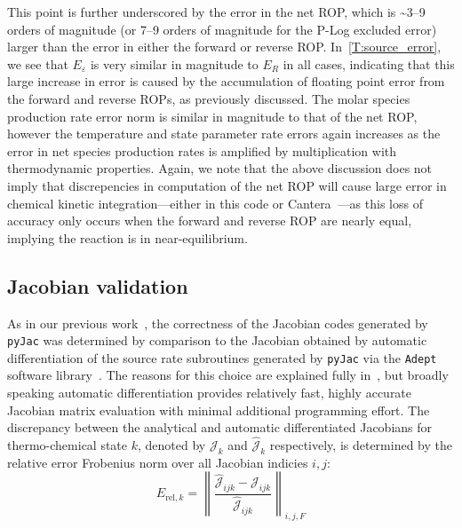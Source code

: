\documentclass[12pt,number,sort&compress,preprint]{elsarticle}
\begin{document}
This point is further underscored by the error in the net ROP, which is \textasciitilde\numrange{3}{9} orders of magnitude (or \numrange{7}{9} orders of magnitude for the P-Log excluded error) larger than the error in either the forward or reverse ROP.
In~\cref{T:source_error}, we see that $E_{\varepsilon}$ is very similar in magnitude to $E_R$ in all cases, indicating that this large increase in error is caused by the accumulation of floating point error from the forward and reverse ROPs, as previously discussed.
The molar species production rate error norm is similar in magnitude to that of the net ROP, however the temperature and state parameter rate errors again increases as the error in net species production rates is amplified by multiplication with thermodynamic properties.
Again, we note that the above discussion does not imply that discrepencies in computation of the net ROP will cause large error in chemical kinetic integration---either in this code or Cantera~\cite{Cantera}---as this loss of accuracy only occurs when the forward and reverse ROP are nearly equal, implying the reaction is in near-equilibrium.

\subsection{Jacobian validation}

As in our previous work~\cite{Niemeyer:2016aa}, the correctness of the Jacobian codes generated by \texttt{pyJac} was determined by comparison to the Jacobian obtained by automatic differentiation of the source rate subroutines generated by \texttt{pyJac} via the \texttt{Adept} software library~\cite{adept-v11,hogan2014fast}.
The reasons for this choice are explained fully in~\cite{Niemeyer:2016aa}, but broadly speaking automatic differentiation provides relatively fast, highly accurate Jacobian matrix evaluation with minimal additional programming effort.
The discrepancy between the analytical and automatic differentiated Jacobians for thermo-chemical state $k$, denoted by $\mathcal{J}_k$ and $\hat{\mathcal{J}}_k$ respectively, is determined by the relative error Frobenius norm over all Jacobian indicies $i, j$:
\begin{equation}
 \label{e:jac_error_base}
 E_{\text{rel}, k} = \left\lVert \frac{\hat{\mathcal{J}}_{ijk} - \mathcal{J}_{ijk}}{\hat{\mathcal{J}}_{ijk}} \right\rVert_{i,j,F}
\end{equation}
\end{document}
